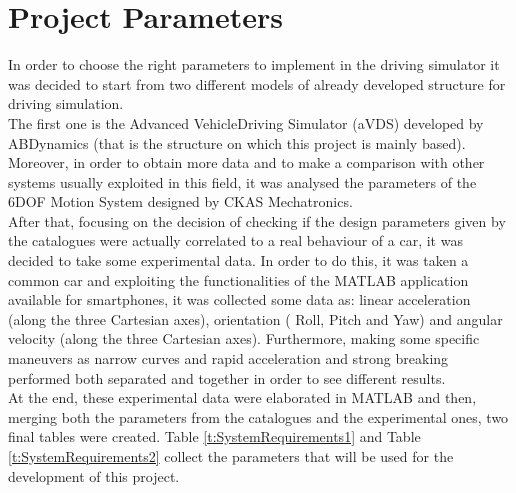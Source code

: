 \documentclass[10.5pt, twocolumn]{article}
\begin{document}
\section{Project Parameters}
In order to choose the right parameters to implement in the driving simulator it was decided to start from two different models of already developed structure for driving simulation.\\
The first one is the Advanced VehicleDriving Simulator (aVDS) developed by ABDynamics (that is the structure on which this project is mainly based). Moreover, in order to obtain more data and to make a comparison with other systems usually exploited in this field, it was analysed the parameters of the 6DOF Motion System designed by CKAS Mechatronics.\\
After that, focusing on the decision of checking if the design parameters given by the catalogues were actually correlated to a real behaviour of a car, it was decided to take some experimental data. In order to do this, it was taken a common car and exploiting the functionalities of the MATLAB application available for smartphones, it was collected some data as: linear acceleration (along the three Cartesian axes), orientation ( Roll, Pitch and Yaw) and angular velocity (along the three Cartesian axes). Furthermore, making some specific maneuvers as narrow curves and rapid acceleration and strong breaking performed both separated and together in order to see different results.\\
At the end, these experimental data were elaborated in MATLAB and then, merging both the parameters from the catalogues and the experimental ones, two final tables were created. Table \ref{t:SystemRequirements1} and Table \ref{t:SystemRequirements2} collect the parameters that will be used for the development of this project. 
\end{document}
